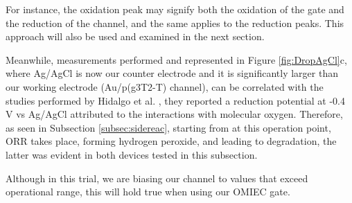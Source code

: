 For instance, the oxidation peak may signify both the oxidation of the gate and the reduction of the channel, and the same applies to the reduction peaks. This approach will also be used and examined in the next section.

Meanwhile, measurements performed and represented in Figure \ref{fig:DropAgCl}c, where Ag/AgCl is now our counter electrode and it is significantly larger than our working electrode (Au/p(g3T2-T) channel), %
can be correlated with the studies performed by Hidalgo et al. \cite{hidalgocastilloSimultaneousPerformanceStability2022a}, they reported a reduction potential at -0.4 V vs Ag/AgCl attributed to the interactions with molecular oxygen. Therefore, as seen in Subsection \ref{subsec:sidereac}, starting from at this operation point, ORR takes place, forming hydrogen peroxide, and leading to degradation, the latter was evident in both devices tested in this subsection.

Although in this trial, we are biasing our channel to values that exceed operational range, this will hold true when using our OMIEC gate. %





